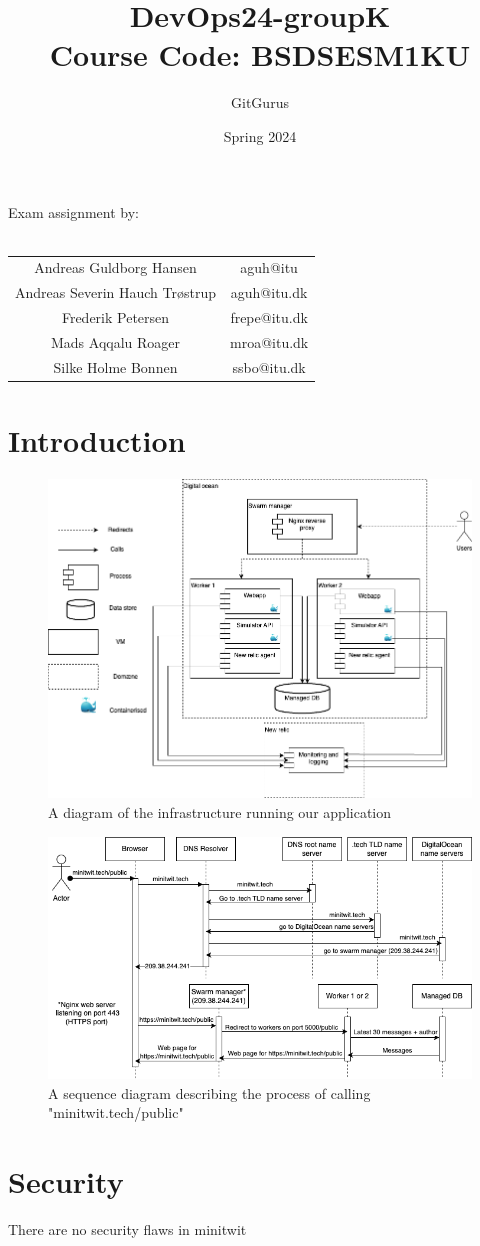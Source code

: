\documentclass{article}
\title{DevOps24-groupK\\
\large Course Code: BSDSESM1KU}
\author{GitGurus}
\date{Spring 2024}
\begin{document}
\maketitle

Exam assignment by:\\\\
\centering
\begin{tabular}{c|c}
    Andreas Guldborg Hansen & aguh@itu \\
    Andreas Severin Hauch Trøstrup & aguh@itu.dk \\
    Frederik Petersen & frepe@itu.dk \\
    Mads Aqqalu Roager & mroa@itu.dk \\
    Silke Holme Bonnen & ssbo@itu.dk
\end{tabular}

\newpage


\section{Introduction}
\begin{figure}[H]
    \centering
    \includegraphics[width=\textwidth]{images/devops-overview.png}
    \caption{A diagram of the infrastructure running our application}
    \label{fig:infrastructure}
\end{figure}
\begin{figure}[H]
    \centering
    \includegraphics[width=\textwidth]{images/devops-sequence.png}
    \caption{A sequence diagram describing the process of calling "minitwit.tech/public"}
    \label{fig:sequence}
\end{figure}

\section{Security}
There are no security flaws in minitwit
\end{document}
